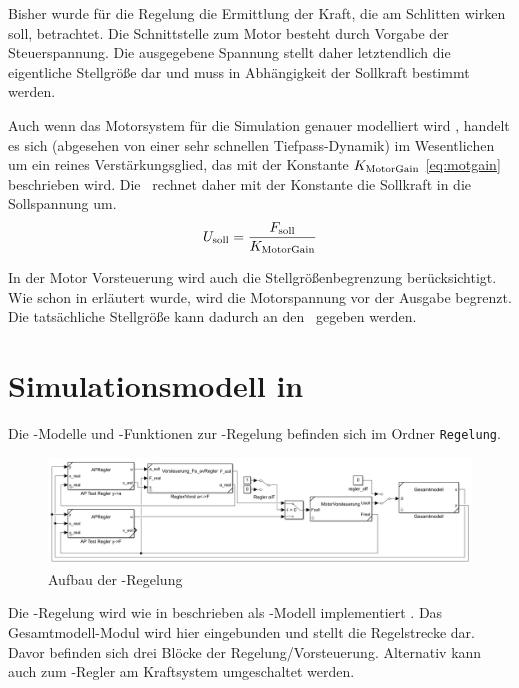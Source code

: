Bisher wurde für die Regelung die Ermittlung der Kraft, die am Schlitten wirken soll, betrachtet.
Die Schnittstelle zum Motor besteht durch Vorgabe der Steuerspannung.
Die ausgegebene Spannung stellt daher letztendlich die eigentliche Stellgröße dar und muss in Abhängigkeit der Sollkraft bestimmt werden.

Auch wenn das Motorsystem für die Simulation genauer modelliert wird , handelt es sich (abgesehen von einer sehr schnellen Tiefpass-Dynamik) im Wesentlichen um ein reines Verstärkungsglied, das mit der Konstante $K_{\mathrm{MotorGain}}$ \eqref{eq:motgain} beschrieben wird. %
Die \vorst\ rechnet daher mit der Konstante die Sollkraft in die Sollspannung um.
	\[
	U_{\mathrm{soll}}=\frac{F_{\mathrm{soll}}}{K_{\mathrm{MotorGain}}}
\]

In der Motor Vorsteuerung wird auch die Stellgrößenbegrenzung berücksichtigt. 
Wie schon in  erläutert wurde, wird die Motorspannung vor der Ausgabe begrenzt.
Die tatsächliche Stellgröße kann dadurch an den \beob\ gegeben werden.




\section{Simulationsmodell in \Simulink}

Die \sm-Modelle und \ml-Funktionen zur \ap-Regelung befinden sich im Ordner \texttt{Regelung}.

\begin{figure}
	\centering
		\includegraphics[width=1.00\textwidth]{Bilder/Simulink/ap_regelung_test ohne outofc.PNG}
	\caption{Aufbau der \ap-Regelung}
	\label{fig:simapr}
\end{figure}

Die \ap-Regelung wird wie in  beschrieben als \sm-Modell implementiert .
Das Gesamtmodell-Modul  wird hier eingebunden und stellt die Regelstrecke dar.
Davor befinden sich drei Blöcke der Regelung/Vorsteuerung.
Alternativ kann auch zum \ap-Regler am Kraftsystem umgeschaltet werden.

